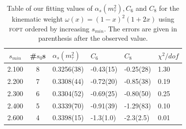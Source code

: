 \documentclass[../../index.tex]{subfiles}
\begin{document}
\begin{table}
  \centering
  \begin{tabularx}{\textwidth}{ccYYYY}
    \toprule
    \(s_{min}\) & \#\(s_0\)s & \(\alpha_s(m_\tau^2)\) & \(C_6\) & \(C_8\) & \(\chi^2/dof\)  \\
    \midrule
    2.100 & 8 & 0.3256(38) & -0.43(15) & -0.25(28) & 1.30 \\
    2.200 & 7 & 0.3308(44) & -0.72(20) & -0.85(38) & 0.19 \\
    2.300 & 6 & 0.3304(52) & -0.69(25) & -0.80(50) & 0.25 \\
    2.400 & 5 & 0.3339(70) & -0.91(39) & -1.29(83) & 0.10 \\
    2.600 & 4 & 0.3398(15) & -1.3(1.0) & -2.3(2.5) & 0.01  \\
    \bottomrule
  \end{tabularx}
  \caption{Table of our fitting values of \(\alpha_s(m_\tau^2), C_6\) and
    \(C_8\) for the kinematic weight \(\omega(x)=(1-x)^2(1+2x)\) using
    \textsc{fopt} ordered by increasing \(s_{min}\). The errors are given in
    parenthesis after the observed value.}
  \label{table:fitWKinAlD6D8}
\end{table}
\end{document}
